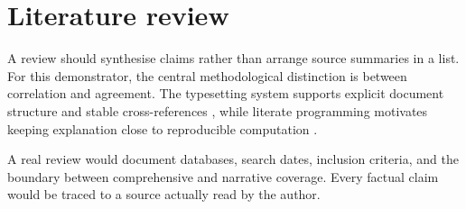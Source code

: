 \chapter{Literature review}
\label{chap:literature}

A review should synthesise claims rather than arrange source summaries in a
list. For this demonstrator, the central methodological distinction is between
correlation and agreement. The typesetting system supports explicit document
structure and stable cross-references \parencite{lamport1994}, while literate
programming motivates keeping explanation close to reproducible computation
\parencite{knuth1984}.

A real review would document databases, search dates, inclusion criteria, and
the boundary between comprehensive and narrative coverage. Every factual claim
would be traced to a source actually read by the author.

